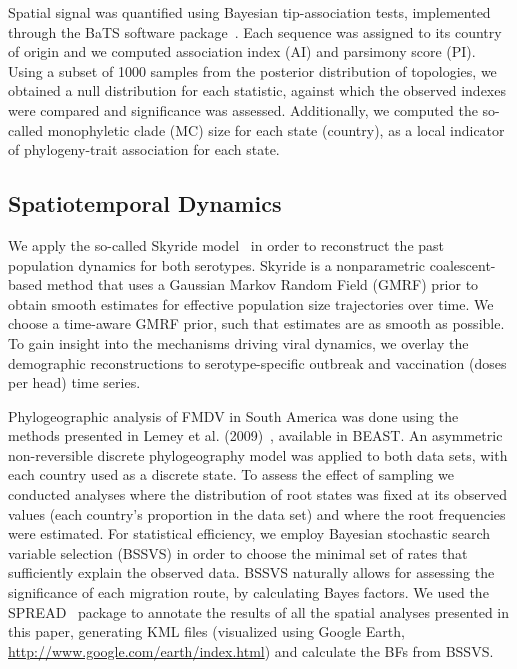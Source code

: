 \documentclass[10pt]{article}
\begin{document}
Spatial signal was quantified using Bayesian tip-association tests, implemented through the BaTS software package~\cite{bats}.
Each sequence was assigned to its country of origin and we computed association index (AI) and parsimony score (PI).
Using a subset of 1000 samples from the posterior distribution of topologies, we obtained a null distribution for each statistic, against which the observed indexes were compared and significance was assessed.
Additionally, we computed the so-called monophyletic clade (MC) size for each state (country), as a local indicator of phylogeny-trait association for each state.


\subsection*{Spatiotemporal Dynamics}

We apply the so-called Skyride model~\cite{skyride} in order to reconstruct the past population dynamics for both serotypes. Skyride is a nonparametric coalescent-based method that uses a Gaussian Markov Random Field (GMRF) prior to obtain smooth estimates for effective population size trajectories over time. We choose a time-aware GMRF prior, such that estimates are as smooth as possible.
To gain insight into the mechanisms driving viral dynamics, we overlay the demographic reconstructions to serotype-specific outbreak and vaccination (doses per head) time series.

Phylogeographic analysis of FMDV in South America was done using the methods presented in Lemey et al. (2009)~\cite{roots}, available in BEAST. 
An asymmetric non-reversible discrete phylogeography model was applied to both data sets, with each country used as a discrete state.
To assess the effect of sampling we conducted analyses where the distribution of root states was fixed at its observed values (each country's proportion in the data set) and where the root frequencies were estimated.
For statistical efficiency, we employ Bayesian stochastic search variable selection (BSSVS) in order to choose the minimal set of rates that sufficiently explain the observed data.
BSSVS naturally allows for assessing the significance of each migration route, by calculating Bayes factors.
We used the SPREAD~\cite{spread} package to annotate the results of all the spatial analyses presented in this paper, generating KML files (visualized using Google Earth, \url{http://www.google.com/earth/index.html}) and calculate the BFs from BSSVS.
\end{document}
